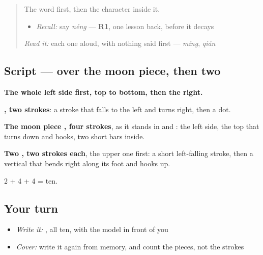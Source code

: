 \label{lesson:ZH-W90-neng}



\begin{quote}
The word first, then the character inside it.

\begin{itemize}
\raggedright
  \item \emph{Recall:} say \emph{néng} — \textbf{R1}, one lesson back, before it decays
\end{itemize}

\begin{quote}
 
\end{quote}

\emph{Read it:} each one aloud, with nothing said first — \emph{míng}, \emph{qián}
\end{quote}

\subsection*{Script —  over the moon piece, then two }

\begin{quote}
\end{quote}

\textbf{The whole left side first, top to bottom, then the right.}

\textbf{, two strokes}: a stroke that falls to the left and turns right, then a dot.

\textbf{The moon piece , four strokes}, as it stands in  and : the left side, the top that turns down and hooks, two short bars inside.

\textbf{Two , two strokes each}, the upper one first: a short left-falling stroke, then a vertical that bends right along its foot and hooks up.

2 + 4 + 4 = ten.

\subsection*{Your turn}
\begin{itemize}
\raggedright
  \item \emph{Write it:} , all ten, with the model in front of you
  \item \emph{Cover:} write it again from memory, and count the pieces, not the strokes
\end{itemize}

